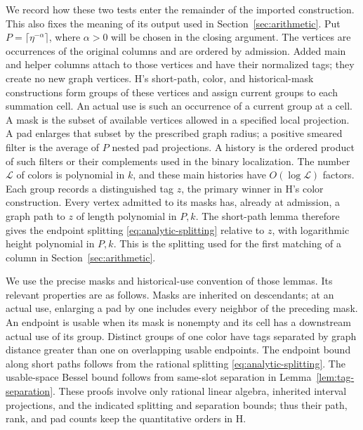 We record how these two tests enter the remainder of the imported
construction.  This also fixes the meaning of its output used in
Section~\ref{sec:arithmetic}.  Put \(P=\lceil\eta^{-\alpha}\rceil\),
where \(\alpha>0\) will be chosen in the closing argument.  The
vertices are occurrences of the original columns and are ordered by
admission.  Added main and helper columns attach to those vertices
and have their normalized tags; they create no new graph vertices.
H's short-path, color, and historical-mask constructions
\cite[Lemmas~6.2--6.5]{H} form groups of these vertices and assign
current groups to each summation cell.  An actual use is such an
occurrence of a current group at a cell.  A mask is
the subset of available vertices allowed in a specified local
projection.  A pad enlarges that subset by the prescribed graph
radius; a positive smeared filter is the average of \(P\) nested
pad projections.  A history is the ordered product of such filters
or their complements used in the binary localization.  The number
\(\mathcal L\) of colors is polynomial in \(k\), and these main
histories have \(O(\log\mathcal L)\) factors.
Each group records a distinguished tag \(z\), the primary winner
in H's color construction.  Every vertex admitted to its masks
has, already at admission, a graph path to \(z\) of length
polynomial in \(P,k\).  The short-path lemma therefore gives the
endpoint splitting \eqref{eq:analytic-splitting} relative to \(z\),
with logarithmic height polynomial in \(P,k\).  This is the
splitting used for the first matching of a column in
Section~\ref{sec:arithmetic}.

We use the precise masks and historical-use convention of those
lemmas.  Its relevant properties are as follows.  Masks are
inherited on descendants; at an actual use, enlarging a pad by one
includes every neighbor of the preceding mask.  An endpoint is usable when its
mask is nonempty and its cell has a downstream actual use of its
group.  Distinct groups of one color have tags separated by graph
distance greater than one on overlapping usable endpoints.
The endpoint bound along short paths follows from the rational
splitting \eqref{eq:analytic-splitting}.  The usable-space Bessel
bound follows from same-slot separation in
Lemma~\ref{lem:tag-separation}.  These proofs involve only rational
linear algebra, inherited interval projections, and the indicated
splitting and separation bounds; thus their path, rank, and pad
counts keep the quantitative orders in H.

